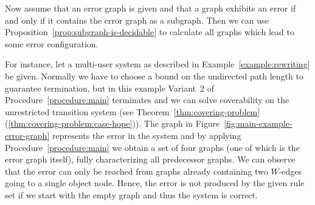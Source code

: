 \documentclass{llncs}
\begin{document}
\begin{example}
  Now assume that an error graph is given and that a graph exhibits an error if 
  and only if it contains the error graph as a subgraph. Then we can use
  Proposition~\ref{prop:subgraph-is-decidable} to calculate all graphs
  which lead to some error configuration.

  For instance, let a multi-user system as described in
  Example~\ref{example:rewriting} be given. Normally we have to choose
  a bound on the undirected path length to guarantee termination, but
  in this example Variant~2 of Procedure~\ref{procedure:main}
  terminates and we can solve coverability on the unrestricted
  transition system (see
  Theorem~\ref{thm:covering-problem}(\ref{thm:covering-problem:case-hope})).
  The graph in Figure~\ref{fig:main-example-error-graph} represents
  the error in the system and by applying
  Procedure~\ref{procedure:main} we obtain a set of four graphs (one
  of which is the error graph itself), fully characterizing all
  predecessor graphs. We can observe that the error can only be
  reached from graphs already containing two $W$-edges going to a
  single object node. Hence, the error is not produced by the given
  rule set if we start with the empty graph and thus the system is
  correct.


\end{example}
\end{document}
